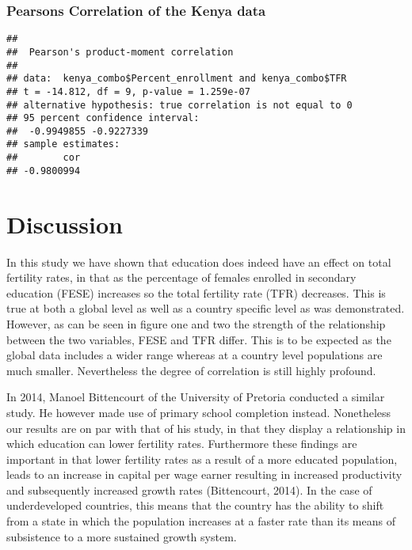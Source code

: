 \documentclass[11pt,]{article}
\begin{document}
\subsubsection{Pearsons Correlation of the Kenya
data}\label{pearsons-correlation-of-the-kenya-data-1}

\begin{verbatim}
## 
##  Pearson's product-moment correlation
## 
## data:  kenya_combo$Percent_enrollment and kenya_combo$TFR
## t = -14.812, df = 9, p-value = 1.259e-07
## alternative hypothesis: true correlation is not equal to 0
## 95 percent confidence interval:
##  -0.9949855 -0.9227339
## sample estimates:
##        cor 
## -0.9800994
\end{verbatim}

\section{Discussion}\label{discussion}

In this study we have shown that education does indeed have an effect on
total fertility rates, in that as the percentage of females enrolled in
secondary education (FESE) increases so the total fertility rate (TFR)
decreases. This is true at both a global level as well as a country
specific level as was demonstrated. However, as can be seen in figure
one and two the strength of the relationship between the two variables,
FESE and TFR differ. This is to be expected as the global data includes
a wider range whereas at a country level populations are much smaller.
Nevertheless the degree of correlation is still highly profound.

In 2014, Manoel Bittencourt of the University of Pretoria conducted a
similar study. He however made use of primary school completion instead.
Nonetheless our results are on par with that of his study, in that they
display a relationship in which education can lower fertility rates.
Furthermore these findings are important in that lower fertility rates
as a result of a more educated population, leads to an increase in
capital per wage earner resulting in increased productivity and
subsequently increased growth rates (Bittencourt, 2014). In the case of
underdeveloped countries, this means that the country has the ability to
shift from a state in which the population increases at a faster rate
than its means of subsistence to a more sustained growth system.
\end{document}
